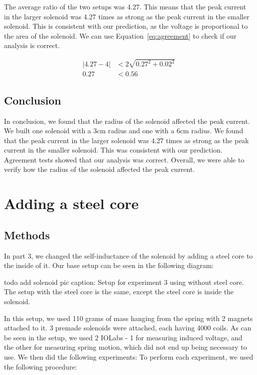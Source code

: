 \documentclass[11pt]{article}
\let\oldsection\section
\renewcommand\section{\clearpage\oldsection}
\begin{document}
    The average ratio of the two setups was 4.27.
    This means that the peak current in the larger solenoid was 4.27 times as strong as the peak current in the smaller solenoid.
    This is consistent with our prediction, as the voltage is proportional to the area of the solenoid.
    We can use Equation~\ref{eq:agreement} to check if our analysis is correct.

    \begin{align*}
        |4.27 - 4| &< 2 \sqrt{0.27^2 + 0.02^2} \\
        0.27 &< 0.56
    \end{align*}

    \subsection{Conclusion}\label{subsec:part_2_conclusion}

    In conclusion, we found that the radius of the solenoid affected the peak current.
    We built one solenoid with a 3cm radius and one with a 6cm radius.
    We found that the peak current in the larger solenoid was 4.27 times as strong as the peak current in the smaller solenoid.
    This was consistent with our prediction.
    Agreement tests showed that our analysis was correct.
    Overall, we were able to verify how the radius of the solenoid affected the peak current.

    \section{Adding a steel core}\label{sec:part_3}
    \subsection{Methods}\label{subsec:part_3_methods}
    In part 3, we changed the self-inductance of the solenoid by adding a steel core to the inside of it. Our base setup can be seen in the following diagram:

    todo add solenoid pic
    caption: Setup for experiment 3 using without steel core. The setup with the steel core is the same, except the steel core is inside the solenoid.

    In this setup, we used 110 grams of mass hanging from the spring with 2 magnets attached to it. 3 premade solenoids were attached, each having 4000 coils. As can be seen in the setup, we used 2 IOLabs - 1 for measuring induced voltage, and the other for measuring spring motion, which did not end up being necessary to use. We then did the following experiments: To perform each experiment, we used the following procedure:
\end{document}
